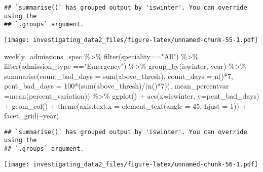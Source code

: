\documentclass[
]{article}
\newenvironment{Shaded}{\begin{snugshade}}{\end{snugshade}}
\newcommand{\AttributeTok}[1]{\textcolor[rgb]{0.77,0.63,0.00}{#1}}
\newcommand{\DecValTok}[1]{\textcolor[rgb]{0.00,0.00,0.81}{#1}}
\newcommand{\FunctionTok}[1]{\textcolor[rgb]{0.00,0.00,0.00}{#1}}
\newcommand{\NormalTok}[1]{#1}
\newcommand{\SpecialCharTok}[1]{\textcolor[rgb]{0.00,0.00,0.00}{#1}}
\newcommand{\StringTok}[1]{\textcolor[rgb]{0.31,0.60,0.02}{#1}}
\begin{document}
\begin{verbatim}
## `summarise()` has grouped output by 'iswinter'. You can override using the
## `.groups` argument.
\end{verbatim}

\texttt{[image: investigating\_data2\_files/figure-latex/unnamed-chunk-55-1.pdf]}

\begin{Shaded}
\begin{Highlighting}[]
\NormalTok{weekly\_admissions\_spec }\SpecialCharTok{\%\textgreater{}\%} 
  \FunctionTok{filter}\NormalTok{(speciality}\SpecialCharTok{==}\StringTok{"All"}\NormalTok{) }\SpecialCharTok{\%\textgreater{}\%} 
  \FunctionTok{filter}\NormalTok{(admission\_type }\SpecialCharTok{==}\StringTok{"Emergency"}\NormalTok{) }\SpecialCharTok{\%\textgreater{}\%} 
  \FunctionTok{group\_by}\NormalTok{(iswinter, year) }\SpecialCharTok{\%\textgreater{}\%} 
  \FunctionTok{summarise}\NormalTok{(}\AttributeTok{count\_bad\_days =} \FunctionTok{sum}\NormalTok{(above\_thresh), }
            \AttributeTok{count\_days =} \FunctionTok{n}\NormalTok{()}\SpecialCharTok{*}\DecValTok{7}\NormalTok{, }
            \AttributeTok{pcnt\_bad\_days =} \DecValTok{100}\SpecialCharTok{*}\NormalTok{(}\FunctionTok{sum}\NormalTok{(above\_thresh)}\SpecialCharTok{/}\NormalTok{(}\FunctionTok{n}\NormalTok{()}\SpecialCharTok{*}\DecValTok{7}\NormalTok{)), }
            \AttributeTok{mean\_percentvar =}\FunctionTok{mean}\NormalTok{(percent\_variation)) }\SpecialCharTok{\%\textgreater{}\%} 
  \FunctionTok{ggplot}\NormalTok{() }\SpecialCharTok{+}
  \FunctionTok{aes}\NormalTok{(}\AttributeTok{x=}\NormalTok{iswinter, }\AttributeTok{y=}\NormalTok{pcnt\_bad\_days) }\SpecialCharTok{+}
  \FunctionTok{geom\_col}\NormalTok{() }\SpecialCharTok{+}
  \FunctionTok{theme}\NormalTok{(}\AttributeTok{axis.text.x =} \FunctionTok{element\_text}\NormalTok{(}\AttributeTok{angle =} \DecValTok{45}\NormalTok{, }\AttributeTok{hjust =} \DecValTok{1}\NormalTok{)) }\SpecialCharTok{+}
  \FunctionTok{facet\_grid}\NormalTok{(}\SpecialCharTok{\textasciitilde{}}\NormalTok{year)}
\end{Highlighting}
\end{Shaded}

\begin{verbatim}
## `summarise()` has grouped output by 'iswinter'. You can override using the
## `.groups` argument.
\end{verbatim}

\texttt{[image: investigating\_data2\_files/figure-latex/unnamed-chunk-56-1.pdf]}
\end{document}
